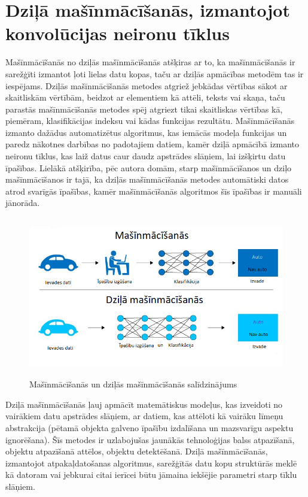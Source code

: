 \section{Dziļā mašīnmācīšanās, izmantojot konvolūcijas neironu tīklus}
Mašīnmācīšanās no dziļās mašīnmācīšanās atšķiras ar to, ka mašīnmācīšanās ir sarežģīti izmantot ļoti lielas datu kopas, taču ar dziļās apmācības metodēm tas ir iespējams. Dziļās mašīnmācīšanās metodes atgriež jebkādas vērtības sākot ar skaitliskām vērtībām, beidzot ar elementiem kā attēli, teksts vai skaņa, taču parastās mašīnmācīšanās metodes spēj atgriezt tikai skaitliskas vērtības kā, piemēram, klasifikācijas indeksu vai kādas funkcijas rezultātu. Mašīnmācīšanās izmanto dažādus automatizētus algoritmus, kas iemācās modeļa funkcijas un paredz nākotnes darbības no padotajiem datiem, kamēr dziļā apmācībā izmanto neironu tīklus, kas laiž datus caur daudz apstrādes slāņiem, lai izšķirtu datu īpašības. Lielākā atšķirība, pēc autora domām, starp mašīnmācīšanos un dziļo mašīnmācīšanos ir tajā, ka dziļās mašīnmācīšanās metodes automātiski datos atrod svarīgās īpašības, kamēr mašīnmācīšanās algoritmos šīs īpašības ir manuāli jānorāda. 
\begin{figure}[h]%
	\centering
	\includegraphics[height=7cm]{images/deeplearning.png} %
	\caption{Mašīnmācīšanās un dziļās mašīnmācīšanās salīdzinājums}%
	\label{fig:example}%
\end{figure}
Dziļā mašīnmācīšanās ļauj apmācīt matemātiskus modeļus, kas izveidoti no vairākiem datu apstrādes slāņiem, ar datiem, kas attēloti kā vairāku līmeņu abstrakcija (pētamā objekta galveno īpašību izdalīšana un mazsvarīgu aspektu ignorēšana). Šīs metodes ir uzlabojušas jaunākās tehnoloģijas balss atpazīšanā, objektu atpazīšanā attēlos, objektu detektēšanā. Dziļā mašīnmācīšanās, izmantojot atpakaļdatošanas algoritmus, sarežģītās datu kopu struktūrās meklē kā datoram vai jebkurai citai ierīcei būtu jāmaina iekšējie parametri starp tīklu slāņiem.

